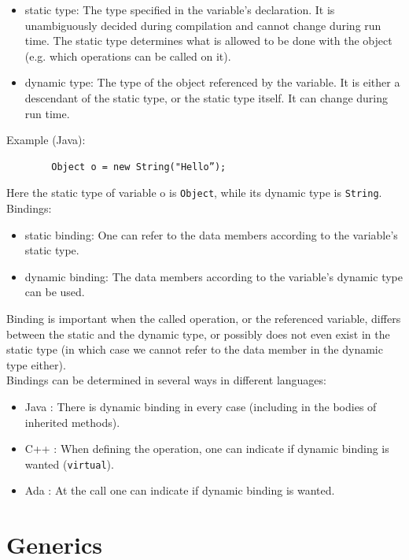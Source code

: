 \documentclass[margin=0px]{article}
\begin{document}
\begin{itemize}
    \item	static type: The type specified in the variable's declaration. It is unambiguously decided during compilation and cannot change
          during run time. The static type determines what is allowed to be done with the object (e.g. which
          operations can be called on it).

    \item	dynamic type: The type of the object referenced by the variable. It is either a descendant of the static type, or
          the static type itself. It can change during run time.
\end{itemize}

\noindent Example (Java):
\begin{verbatim}
        Object o = new String("Hello”);
    \end{verbatim}
Here the static type of variable o is \texttt{Object}, while its dynamic type is \texttt{String}.\\

\noindent Bindings:
\begin{itemize}
    \item	static binding: One can refer to the data members according to the variable's static type.
    \item	dynamic binding: The data members according to the variable's dynamic type can be used.
\end{itemize}

Binding is important when the called operation, or the referenced variable, differs between the static and the dynamic
type, or possibly does not even exist in the static type (in which case we cannot refer to the data member
in the dynamic type either).\\

\noindent Bindings can be determined in several ways in different languages:
\begin{itemize}
    \item	Java : There is dynamic binding in every case (including in the bodies of inherited methods).
    \item	C++ : When defining the operation, one can indicate if dynamic binding is wanted (\texttt{virtual}).
    \item	Ada : At the call one can indicate if dynamic binding is wanted.
\end{itemize}

\section{Generics}
\end{document}
